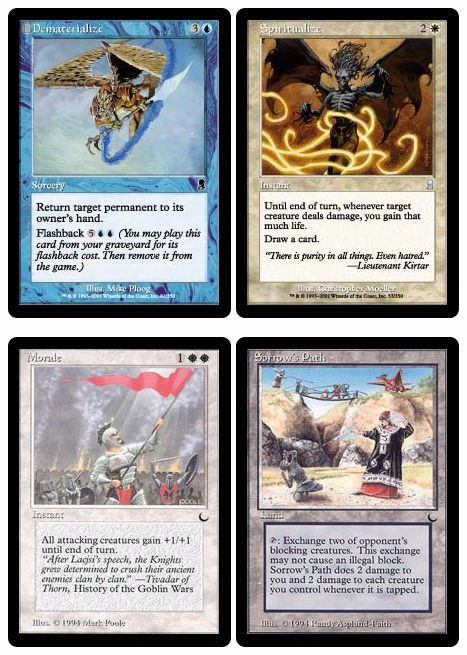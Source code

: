 \documentclass[12pt,a4paper]{article}
\begin{document}
		\begin{center}
			\includegraphics{dematerialize} \includegraphics{spiritualize}

			\includegraphics{morale} \includegraphics{sorrow}


\end{center}
\end{document}

